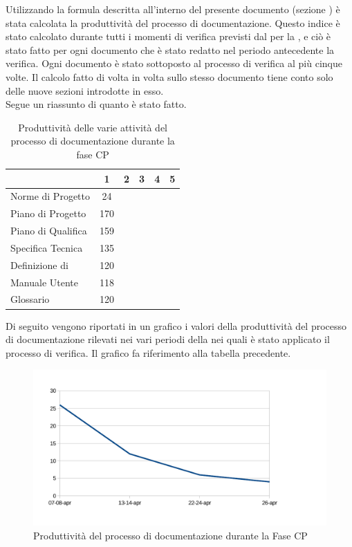 Utilizzando la formula descritta all'interno del presente documento (sezione ) è stata calcolata la produttività del processo di documentazione. Questo indice è stato calcolato durante tutti i momenti di verifica previsti dal  per la , e ciò è stato fatto per ogni documento che è stato redatto nel periodo antecedente la verifica. Ogni documento è stato sottoposto al processo di verifica al più cinque volte. Il calcolo fatto di volta in volta sullo stesso documento tiene conto solo delle nuove sezioni introdotte in esso.\\
Segue un riassunto di quanto è stato fatto.
\begin{table}[H]
      \centering
		\begin{tabu}{| l | c | c | c | c | c |}
		\hline
		&1	&2	&3	&4	&5	\\ \hline
		Norme di Progetto	& 24 &	&	&	& \\ \hline
		Piano di Progetto	& 170 &	&	&	& \\ \hline
		Piano di Qualifica	& 159	&	&	&	&\\ \hline
		Specifica Tecnica & 135 & & & \\ \hline
		Definizione di  & 120 &	 	&	&  	&\\ \hline
		Manuale Utente & 118	&	&	&	& \\ \hline
		Glossario & 120 &  & & &\\ \hline
		\end{tabu}
		\caption{Produttività delle varie attività del processo di documentazione durante la fase CP}
\end{table}
Di seguito vengono riportati in un grafico i valori della produttività del processo di documentazione rilevati nei vari periodi della  nei quali è stato applicato il processo di verifica. Il grafico fa riferimento alla tabella precedente.\\
\begin{figure}[H]
	\centering
		\includegraphics[width=12cm]{PianoDiQualifica/Pics/ProduttivitaDocumentazioneFaseCP.pdf}
	\caption{Produttività del processo di documentazione durante la Fase CP}
\end{figure}
